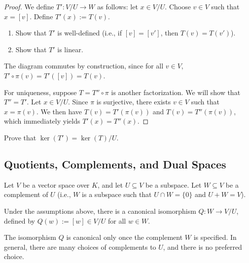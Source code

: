 \begin{proof}
  We define $T' \colon V/U \to W$ as follows: let $x \in V/U$. Choose $v \in V$ such that $x = [v]$. Define $T'(x) := T(v)$.

  \begin{exercise}
    \begin{enumerate}
      \item Show that $T'$ is well-defined (i.e., if $[v] = [v']$, then $T(v) = T(v')$).
      \item Show that $T'$ is linear.
    \end{enumerate}
  \end{exercise}

  The diagram commutes by construction, since for all $v \in V$, $T' \circ \pi(v) = T'([v]) = T(v)$.

  For uniqueness, suppose $T = T'' \circ \pi$ is another factorization. We will show that $T'' = T'$. Let $x \in V/U$. Since $\pi$ is surjective, there exists $v \in V$ such that $x = \pi(v)$. We then have $T(v) = T'(\pi(v))$ and $T(v) = T''(\pi(v))$, which immediately yields $T'(x) = T''(x)$.
\end{proof}

\begin{exercise}
  Prove that $\ker(T') = \ker(T)/U$.
\end{exercise}

\subsection{Quotients, Complements, and Dual Spaces}

Let $V$ be a vector space over $K$, and let $U \subseteq V$ be a subspace. Let $W \subseteq V$ be a complement of $U$ (i.e., $W$ is a subspace such that $U \cap W = \{0\}$ and $U + W = V$).

\begin{proposition} \label{prop:iso_complement}
  Under the assumptions above, there is a canonical isomorphism $Q \colon W \to V/U$, defined by $Q(w) := [w] \in V/U$ for all $w \in W$.
\end{proposition}

\begin{remark}
  The isomorphism $Q$ is canonical only once the complement $W$ is specified. In general, there are many choices of complements to $U$, and there is no preferred choice.
\end{remark}

